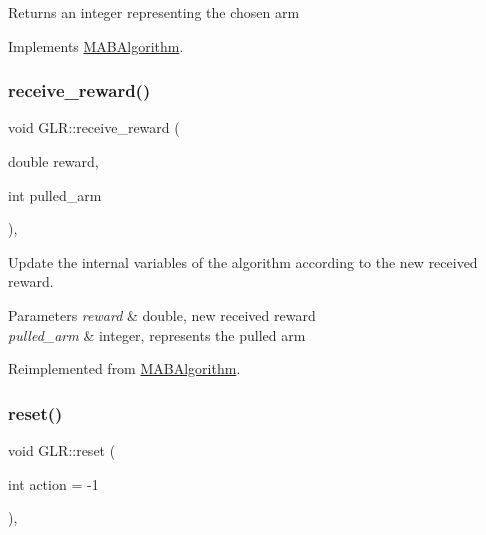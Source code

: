 \begin{DoxyReturn}{Returns}
an integer representing the chosen arm 
\end{DoxyReturn}


Implements \mbox{\hyperlink{class_m_a_b_algorithm_afb48f01df0e1860d19759f6e20335007}{M\+A\+B\+Algorithm}}.

\mbox{\label{class_g_l_r_ad8e409518a110bd57f42a2de1b759707}} 
\subsubsection{\texorpdfstring{receive\+\_\+reward()}{receive\_reward()}}
{\footnotesize\ttfamily void G\+L\+R\+::receive\+\_\+reward (\begin{DoxyParamCaption}\item[{double}]{reward,  }\item[{int}]{pulled\+\_\+arm }\end{DoxyParamCaption})\hspace{0.3cm}{\ttfamily [override]}, {\ttfamily [virtual]}}



Update the internal variables of the algorithm according to the new received reward. 


\begin{DoxyParams}{Parameters}
{\em reward} & double, new received reward \\
\hline
{\em pulled\+\_\+arm} & integer, represents the pulled arm \\
\hline
\end{DoxyParams}


Reimplemented from \mbox{\hyperlink{class_m_a_b_algorithm_aa584b3d6b86fa050e3389be9781b5782}{M\+A\+B\+Algorithm}}.

\mbox{\label{class_g_l_r_ad6c979e855b56e80ecfc54c8c93f035e}} 
\subsubsection{\texorpdfstring{reset()}{reset()}}
{\footnotesize\ttfamily void G\+L\+R\+::reset (\begin{DoxyParamCaption}\item[{int}]{action = {\ttfamily -\/1} }\end{DoxyParamCaption})\hspace{0.3cm}{\ttfamily [override]}, {\ttfamily [virtual]}}



